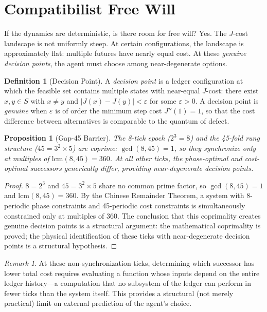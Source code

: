 \documentclass[12pt,a4paper]{article}
\newtheorem{proposition}[theorem]{Proposition}
\theoremstyle{definition}
\newtheorem{definition}[theorem]{Definition}
\theoremstyle{remark}
\newtheorem{remark}[theorem]{Remark}
\begin{document}
\section{Compatibilist Free Will}
\label{sec:freewill}

If the dynamics are deterministic, is there room for free will?  Yes.
The $J$-cost landscape is not uniformly steep.  At certain configurations,
the landscape is approximately flat: multiple futures have nearly equal
cost.  At these \emph{genuine decision points}, the agent must choose among
near-degenerate options.

\begin{definition}[Decision Point]
\label{def:decision}
A \emph{decision point} is a ledger configuration at which the feasible
set contains multiple states with near-equal $J$-cost: there exist
$x, y \in S$ with $x \neq y$ and $|J(x) - J(y)| < \varepsilon$ for some
$\varepsilon > 0$.  A decision point is \emph{genuine} when
$\varepsilon$ is of order the minimum step cost $J''(1) = 1$, so that
the cost difference between alternatives is comparable to the quantum
of defect.
\end{definition}

\begin{proposition}[Gap-45 Barrier]
\label{thm:gap45}
The 8-tick epoch ($2^3 = 8$) and the 45-fold rung structure
($45 = 3^2 \times 5$) are coprime: $\gcd(8, 45) = 1$, so they
synchronize only at multiples of $\mathrm{lcm}(8, 45) = 360$.
At all other ticks, the phase-optimal and cost-optimal successors
generically differ, providing near-degenerate decision points.
\end{proposition}

\begin{proof}
$8 = 2^3$ and $45 = 3^2 \times 5$ share no common prime factor, so
$\gcd(8, 45) = 1$ and $\mathrm{lcm}(8, 45) = 360$.  By the Chinese
Remainder Theorem, a system with 8-periodic phase constraints and
45-periodic cost constraints is simultaneously constrained only at
multiples of 360.  The conclusion that this coprimality creates
genuine decision points is a structural argument: the mathematical
coprimality is proved; the physical identification of these ticks
with near-degenerate decision points is a structural hypothesis.
\end{proof}

\begin{remark}
At these non-synchronization ticks, determining which successor has
lower total cost requires evaluating a function whose inputs depend on
the entire ledger history---a computation that no subsystem of the
ledger can perform in fewer ticks than the system itself.  This provides
a structural (not merely practical) limit on external prediction of the
agent's choice.
\end{remark}
\end{document}
